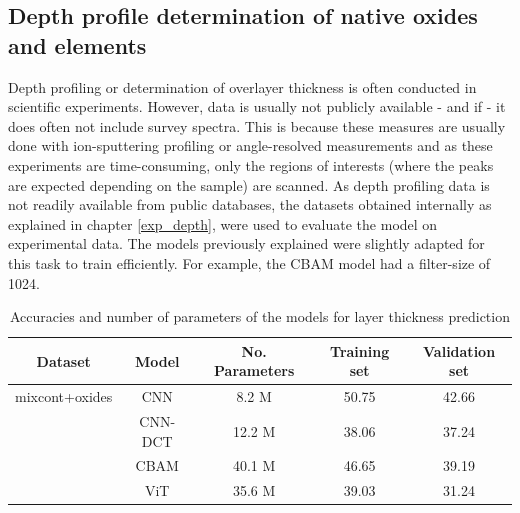 \subsection{Depth profile determination of native oxides and elements}

Depth profiling or determination of overlayer thickness is often conducted in scientific experiments. However, data is usually not publicly available - and if - it does often not include survey spectra. This is because these measures are usually done with ion-sputtering profiling or angle-resolved measurements and as these experiments are time-consuming, only the regions of interests (where the peaks are expected depending on the sample) are scanned.
As depth profiling data is not readily available from public databases, the datasets obtained internally as explained in chapter \ref{exp_depth}, were used to evaluate the model on experimental data. The models previously explained were slightly adapted for this task to train efficiently. For example, the CBAM model had a filter-size of 1024.

\begin{table}[H]
    \centering
    \begin{tabular}{c|c|c|c|c}
        Dataset & Model   & No. Parameters & Training set    & Validation set    \\
        \hline
 mixcont+oxides& CNN     &   8.2 M       &      50.75      &          42.66         \\
               & CNN-DCT &   12.2 M       &     38.06           &      37.24           \\
               & CBAM    &   40.1 M       &    46.65             &      39.19            \\
               & ViT     &    35.6 M     &      39.03            &       31.24           \\

    \end{tabular}
    \caption{Accuracies and number of parameters of the models for layer thickness prediction}
    \label{tab:acc_depth}
\end{table}

